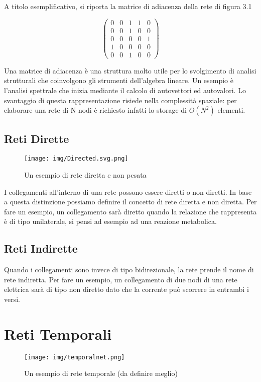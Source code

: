 \documentclass[12pt,twoside]{report}
\begin{document}
	A titolo esemplificativo, si riporta la matrice di adiacenza della rete di figura 3.1
	
	\[
      \begin{pmatrix} 0 & 0 & 1 & 1 & 0 \\
             0 & 0 & 1 & 0 & 0 \\
             0 & 0 & 0 & 0 & 1 \\
             1 & 0 & 0 & 0 & 0 \\
             0 & 0 & 1 & 0 & 0  \end{pmatrix}
\]\vskip 10pt
	
Una matrice di adiacenza è una struttura molto utile per lo svolgimento di analisi strutturali che coinvolgono gli strumenti dell'algebra lineare. Un esempio è l'analisi spettrale che inizia mediante il calcolo di autovettori ed autovalori. Lo svantaggio di questa rappresentazione risiede nella complessità spaziale: per elaborare una rete di N nodi è richiesto infatti lo storage di $O(N^2)$ elementi.

\subsection{Reti Dirette}
\vskip 20pt
	\begin{figure}[htb]
		\centering
		\texttt{[image: img/Directed.svg.png]}
		\caption{Un esempio di rete diretta e non pesata}\label{fig:1}
	\end{figure}
	\vskip 20pt
I collegamenti all'interno di una rete possono essere diretti o non diretti. In base a questa distinzione possiamo definire il concetto di rete diretta e non diretta. Per fare un esempio, un collegamento sarà diretto quando la relazione che rappresenta è di tipo unilaterale, si pensi ad esempio ad una reazione metabolica. 

\subsection{Reti Indirette}
\vskip 20pt
Quando i collegamenti sono invece di tipo bidirezionale, la rete prende il nome di rete indiretta. Per fare un esempio, un collegamento di due nodi di una rete elettrica sarà di tipo non diretto dato che la corrente può scorrere in entrambi i versi.
	
\section{Reti Temporali}
\vskip 20pt
	\begin{figure}[htb]
		\centering
		\texttt{[image: img/temporalnet.png]}
		\caption{Un esempio di rete temporale (da definire meglio)}\label{fig:1}
	\end{figure}
	\vskip 20pt
	
\end{document}

